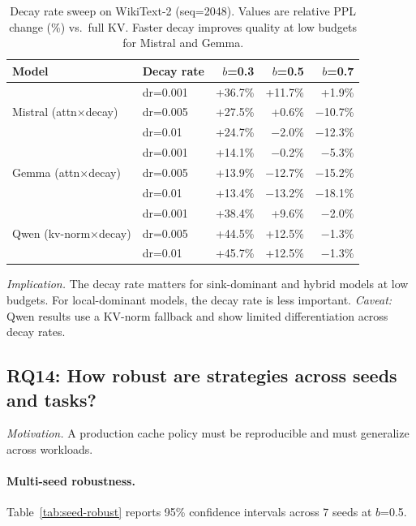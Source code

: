 \documentclass[11pt]{article}
\newcommand{\pct}{\%}
\theoremstyle{definition}
\theoremstyle{plain}
\begin{document}
\begin{table}[t]
\centering
\caption{Decay rate sweep on WikiText-2 (seq=2048).  Values are relative PPL change (\%) vs.\ full KV.  Faster decay improves quality at low budgets for Mistral and Gemma.}
\label{tab:decay-scan}
\small
\begin{tabular}{llrrr}
\toprule
Model & Decay rate & $b$=0.3 & $b$=0.5 & $b$=0.7 \\
\midrule
\multirow{3}{*}{Mistral (attn$\times$decay)} 
 & dr=0.001 & +36.7\pct{} & +11.7\pct{} & +1.9\pct{} \\
 & dr=0.005 & +27.5\pct{} & +0.6\pct{} & $-$10.7\pct{} \\
 & dr=0.01  & +24.7\pct{} & $-$2.0\pct{} & $-$12.3\pct{} \\
\midrule
\multirow{3}{*}{Gemma (attn$\times$decay)} 
 & dr=0.001 & +14.1\pct{} & $-$0.2\pct{} & $-$5.3\pct{} \\
 & dr=0.005 & +13.9\pct{} & $-$12.7\pct{} & $-$15.2\pct{} \\
 & dr=0.01  & +13.4\pct{} & $-$13.2\pct{} & $-$18.1\pct{} \\
\midrule
\multirow{3}{*}{Qwen (kv-norm$\times$decay)} 
 & dr=0.001 & +38.4\pct{} & +9.6\pct{} & $-$2.0\pct{} \\
 & dr=0.005 & +44.5\pct{} & +12.5\pct{} & $-$1.3\pct{} \\
 & dr=0.01  & +45.7\pct{} & +12.5\pct{} & $-$1.3\pct{} \\
\bottomrule
\end{tabular}
\end{table}

\emph{Implication.}  The decay rate matters for sink-dominant and hybrid models at low budgets.  For local-dominant models, the decay rate is less important.  \emph{Caveat:} Qwen results use a KV-norm fallback and show limited differentiation across decay rates.

\subsection{RQ14: How robust are strategies across seeds and tasks?}
\label{sec:rq14}

\emph{Motivation.}  A production cache policy must be reproducible and must generalize across workloads.

\paragraph{Multi-seed robustness.}  Table~\ref{tab:seed-robust} reports 95\pct{} confidence intervals across 7 seeds at $b$=0.5.
\end{document}
